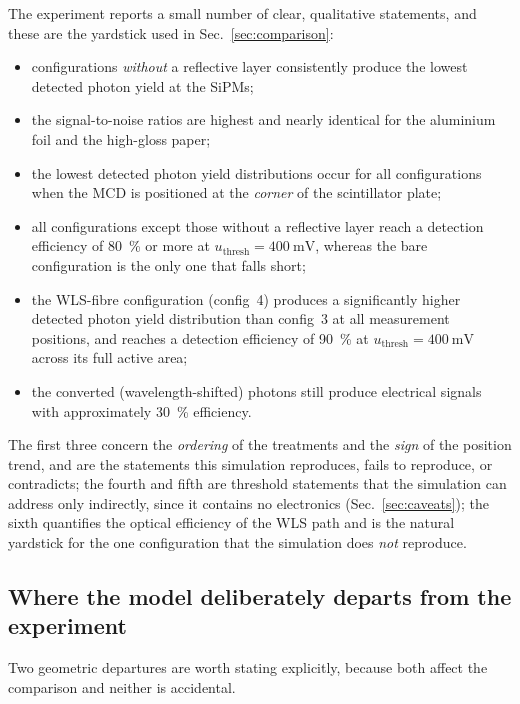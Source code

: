 \documentclass[11pt,a4paper]{article}
\begin{document}
The experiment reports a small number of clear, qualitative statements, and
these are the yardstick used in Sec.~\ref{sec:comparison}:
\begin{itemize}
  \item configurations \emph{without} a reflective layer consistently
        produce the lowest detected photon yield at the SiPMs;
  \item the signal-to-noise ratios are highest and nearly identical for the
        aluminium foil and the high-gloss paper;
  \item the lowest detected photon yield distributions occur for all
        configurations when the MCD is positioned at the \emph{corner} of
        the scintillator plate;
  \item all configurations except those without a reflective layer reach a
        detection efficiency of \SI{80}{\percent} or more at
        $u_{\mathrm{thresh}} = \SI{400}{\milli\volt}$, whereas the bare
        configuration is the only one that falls short;
  \item the WLS-fibre configuration (config~4) produces a significantly
        higher detected photon yield distribution than config~3 at all
        measurement positions, and reaches a detection efficiency of
        \SI{90}{\percent} at $u_{\mathrm{thresh}} = \SI{400}{\milli\volt}$
        across its full active area;
  \item the converted (wavelength-shifted) photons still produce electrical
        signals with approximately \SI{30}{\percent} efficiency.
\end{itemize}
The first three concern the \emph{ordering} of the treatments and the
\emph{sign} of the position trend, and are the statements this simulation
reproduces, fails to reproduce, or contradicts; the fourth and fifth are
threshold statements that the simulation can address only indirectly, since
it contains no electronics (Sec.~\ref{sec:caveats}); the sixth quantifies
the optical efficiency of the WLS path and is the natural yardstick for the
one configuration that the simulation does \emph{not} reproduce.

\subsection{Where the model deliberately departs from the experiment}

Two geometric departures are worth stating explicitly, because both affect
the comparison and neither is accidental.
\end{document}
